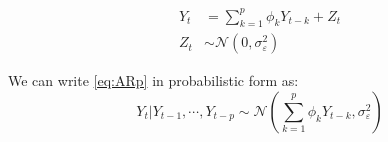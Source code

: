 \begin{align}
    Y_t &= \sum^{p}_{k = 1}{\phi_{k}Y_{t-k}} + Z_t \label{eq:ARp} \\
    Z_t &\sim \mathcal{N}(0, \sigma^{2}_{\varepsilon})
\end{align}

We can write \cref{eq:ARp} in probabilistic form as: 
\begin{equation*}
    Y_t \rvert Y_{t-1}, \cdots, Y_{t-p} \sim \mathcal{N}(\sum^{p}_{k = 1}{\phi_{k}Y_{t-k}}, \sigma^{2}_{\varepsilon})
\end{equation*}



